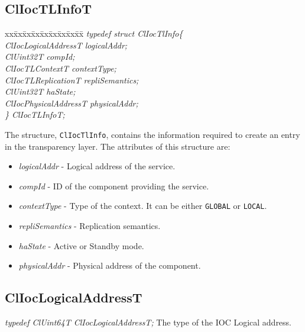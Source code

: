 \begin{flushleft}
\subsection{ClIocTLInfoT}
\begin{tabbing}
xx\=xx\=xx\=xx\=xx\=xx\=xx\=xx\=xx\=\kill
\textit{typedef struct ClIocTlInfo\{}\\
\>\>\>\>\textit{ClIocLogicalAddressT logicalAddr;}\\
\>\>\>\>\textit{ClUint32T compId;}\\
\>\>\>\>\textit{ClIocTLContextT contextType;}\\
\>\>\>\>\textit{ClIocTLReplicationT repliSemantics;}\\
\>\>\>\>\textit{ClUint32T haState;}\\
\>\>\>\>\textit{ClIocPhysicalAddressT physicalAddr;}\\
\textit{\} ClIocTLInfoT;}\end{tabbing}
The structure, {\tt{ClIocTlInfo}}, contains the information required to create an entry in the transparency layer. 
The attributes of this structure are:
\begin{itemize}
\item
\textit{logicalAddr} - Logical address of the service.
\item
\textit{compId} - ID of the component providing the service.
\item
\textit{contextType} - Type of the context. It can be either {\tt{GLOBAL}} or {\tt{LOCAL}}.
\item
\textit{repliSemantics} - Replication semantics.
\item
\textit{haState} - Active or Standby mode.

\item
\textit{physicalAddr} - Physical address of the component.

\end{itemize}


\subsection{ClIocLogicalAddressT}
\textit{typedef ClUint64T ClIocLogicalAddressT;}
\newline
\newline
The type of the IOC Logical address.


\end{flushleft}
